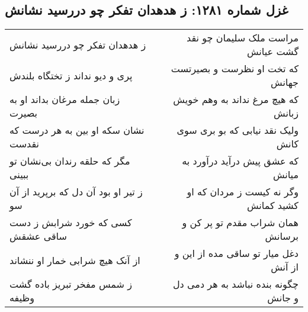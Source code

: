 \begin{center}
\section*{غزل شماره ۱۲۸۱: ز هدهدان تفکر چو دررسید نشانش}
\label{sec:1281}
\begin{longtable}{l p{0.5cm} r}
ز هدهدان تفکر چو دررسید نشانش
&&
مراست ملک سلیمان چو نقد گشت عیانش
\\
پری و دیو نداند ز تختگاه بلندش
&&
که تخت او نظرست و بصیرتست جهانش
\\
زبان جمله مرغان بداند او به بصیرت
&&
که هیچ مرغ نداند به وهم خویش زبانش
\\
نشان سکه او بین به هر درست که نقدست
&&
ولیک نقد نیابی که بو بری سوی کانش
\\
مگر که حلقه رندان بی‌نشان تو ببینی
&&
که عشق پیش درآید درآورد به میانش
\\
ز تیر او بود آن دل که برپرید از آن سو
&&
وگر نه کیست ز مردان که او کشید کمانش
\\
کسی که خورد شرابش ز دست ساقی عشقش
&&
همان شراب مقدم تو پر کن و برسانش
\\
از آنک هیچ شرابی خمار او ننشاند
&&
دغل میار تو ساقی مده از این و از آنش
\\
ز شمس مفخر تبریز باده گشت وظیفه
&&
چگونه بنده نباشد به هر دمی دل و جانش
\\
\end{longtable}
\end{center}
